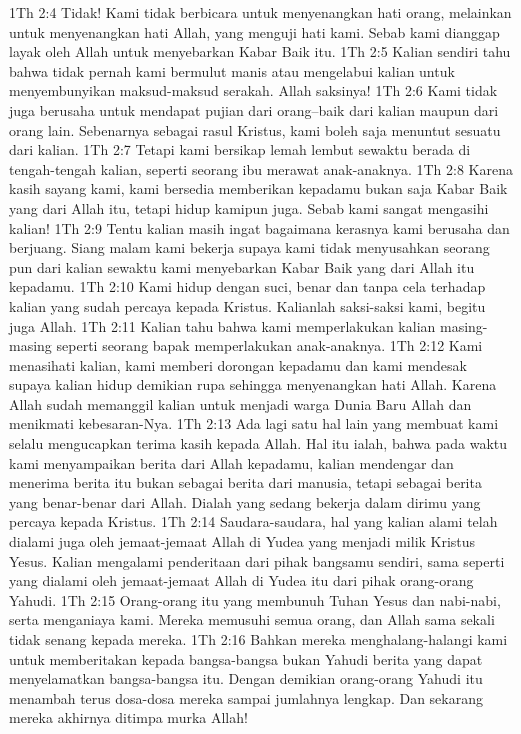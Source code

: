 1Th 2:4  Tidak! Kami tidak berbicara untuk menyenangkan hati orang, melainkan untuk menyenangkan hati Allah, yang menguji hati kami. Sebab kami dianggap layak oleh Allah untuk menyebarkan Kabar Baik itu.
1Th 2:5  Kalian sendiri tahu bahwa tidak pernah kami bermulut manis atau mengelabui kalian untuk menyembunyikan maksud-maksud serakah. Allah saksinya!
1Th 2:6  Kami tidak juga berusaha untuk mendapat pujian dari orang--baik dari kalian maupun dari orang lain. Sebenarnya sebagai rasul Kristus, kami boleh saja menuntut sesuatu dari kalian.
1Th 2:7  Tetapi kami bersikap lemah lembut sewaktu berada di tengah-tengah kalian, seperti seorang ibu merawat anak-anaknya.
1Th 2:8  Karena kasih sayang kami, kami bersedia memberikan kepadamu bukan saja Kabar Baik yang dari Allah itu, tetapi hidup kamipun juga. Sebab kami sangat mengasihi kalian!
1Th 2:9  Tentu kalian masih ingat bagaimana kerasnya kami berusaha dan berjuang. Siang malam kami bekerja supaya kami tidak menyusahkan seorang pun dari kalian sewaktu kami menyebarkan Kabar Baik yang dari Allah itu kepadamu.
1Th 2:10  Kami hidup dengan suci, benar dan tanpa cela terhadap kalian yang sudah percaya kepada Kristus. Kalianlah saksi-saksi kami, begitu juga Allah.
1Th 2:11  Kalian tahu bahwa kami memperlakukan kalian masing-masing seperti seorang bapak memperlakukan anak-anaknya.
1Th 2:12  Kami menasihati kalian, kami memberi dorongan kepadamu dan kami mendesak supaya kalian hidup demikian rupa sehingga menyenangkan hati Allah. Karena Allah sudah memanggil kalian untuk menjadi warga Dunia Baru Allah dan menikmati kebesaran-Nya.
1Th 2:13  Ada lagi satu hal lain yang membuat kami selalu mengucapkan terima kasih kepada Allah. Hal itu ialah, bahwa pada waktu kami menyampaikan berita dari Allah kepadamu, kalian mendengar dan menerima berita itu bukan sebagai berita dari manusia, tetapi sebagai berita yang benar-benar dari Allah. Dialah yang sedang bekerja dalam dirimu yang percaya kepada Kristus.
1Th 2:14  Saudara-saudara, hal yang kalian alami telah dialami juga oleh jemaat-jemaat Allah di Yudea yang menjadi milik Kristus Yesus. Kalian mengalami penderitaan dari pihak bangsamu sendiri, sama seperti yang dialami oleh jemaat-jemaat Allah di Yudea itu dari pihak orang-orang Yahudi.
1Th 2:15  Orang-orang itu yang membunuh Tuhan Yesus dan nabi-nabi, serta menganiaya kami. Mereka memusuhi semua orang, dan Allah sama sekali tidak senang kepada mereka.
1Th 2:16  Bahkan mereka menghalang-halangi kami untuk memberitakan kepada bangsa-bangsa bukan Yahudi berita yang dapat menyelamatkan bangsa-bangsa itu. Dengan demikian orang-orang Yahudi itu menambah terus dosa-dosa mereka sampai jumlahnya lengkap. Dan sekarang mereka akhirnya ditimpa murka Allah!
